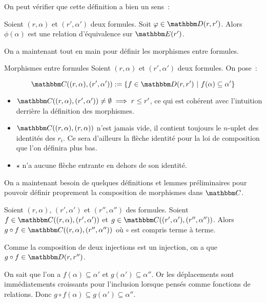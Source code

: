 On peut vérifier que cette définition a bien un sens~:

\begin{lem}
    Soient $(r,\alpha)$ et $(r',\alpha')$ deux formules. Soit $\phi\in\D(r,r')$.
    Alors $\phi(\alpha)$ est une relation d'équivalence sur $\E(r')$.
\end{lem}

On a maintenant tout en main pour définir les morphismes entre formules.

\begin{defi}{Morphismes entre formules}
    Soient $(r,\alpha)$ et $(r',\alpha')$ deux formules. On pose~:

    \[\C((r,\alpha),(r',\alpha')) := \{ f\in\D(r,r') ~|~
                                        f(\alpha)\subseteq \alpha' \}\]
\end{defi}

\begin{rem}\begin{itemize}
    \item $\C((r,\alpha), (r',\alpha'))\neq\emptyset \implies r\leq r'$, ce qui
        est cohérent avec l'intuition derrière la définition des morphismes.
    \item $\C((r,\alpha), (r,\alpha))$ n'est jamais vide, il contient toujours le $n$-uplet
        des identités des $r_i$. Ce sera d'ailleurs la flèche identité pour la loi
        de composition que l'on définira plus bas.
    \item $\star$ n'a aucune flèche entrante en dehors de son identité.
\end{itemize}\end{rem}

On a maintenant besoin de quelques définitions et lemmes préliminaires pour pouvoir
définir proprement la composition de morphismes dans $\C$.

\begin{lem}
    Soient $(r,\alpha)$, $(r',\alpha')$ et $(r'',\alpha'')$ des formules.
    Soient $f\in\C((r,\alpha),(r',\alpha'))$
        et $g\in\C((r',\alpha'),(r'',\alpha''))$.
    Alors $g\circ f\in\C((r,\alpha),(r'',\alpha''))$ où $\circ$ est compris
    terme à terme.
\end{lem}

\begin{pv}
    Comme la composition de deux injections est un injection, on a que
    $g\circ f\in\D(r,r'')$.

    On sait que l'on a $f(\alpha)\subseteq \alpha'$ et $g(\alpha')\subseteq \alpha''$. Or
    les déplacements sont immédiatements croissants pour l'inclusion lorsque pensés
    comme fonctions de relations.
    Donc $g\circ f(\alpha)\subseteq g(\alpha')\subseteq \alpha''$.
\end{pv}

